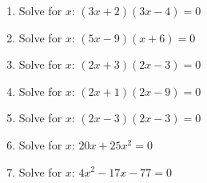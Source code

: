         \label{m39247*id153332}\begin{enumerate}[noitemsep, label=\textbf{\arabic*}. ] 
            \label{m39247*uid44}\item Solve for \begin{math}x\end{math}: \begin{math}\left(3x+2\right)\left(3x-4\right)=0\end{math}\hspace{1ex}        
\label{m39247*uid45}\item Solve for \begin{math}x\end{math}: \begin{math}\left(5x-9\right)\left(x+6\right)=0\end{math}\hspace{1ex}        
\label{m39247*uid46}\item Solve for \begin{math}x\end{math}: \begin{math}\left(2x+3\right)\left(2x-3\right)=0\end{math}\hspace{1ex}        
\label{m39247*uid47}\item Solve for \begin{math}x\end{math}: \begin{math}\left(2x+1\right)\left(2x-9\right)=0\end{math}\hspace{1ex}        
\label{m39247*uid48}\item Solve for \begin{math}x\end{math}: \begin{math}\left(2x-3\right)\left(2x-3\right)=0\end{math}\hspace{1ex}        
\label{m39247*uid49}\item Solve for \begin{math}x\end{math}: \begin{math}20x+25{x}^{2}=0\end{math}\hspace{1ex}        
\label{m39247*uid50}\item Solve for \begin{math}x\end{math}: \begin{math}4{x}^{2}-17x-77=0\end{math}\hspace{1ex}        

\end{enumerate}
